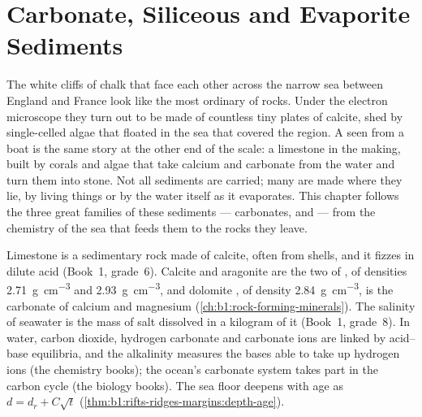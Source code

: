 \chapter{Carbonate, Siliceous and Evaporite Sediments}\label{ch:b1:chemical-biogenic-sediments}

The white cliffs of chalk that face each other across the narrow sea between
England and France look like the most ordinary of rocks. Under the electron
microscope they turn out to be made of countless tiny plates of calcite, shed
by single-celled algae that floated in the sea that covered the region. A
 seen from a boat is the same story at the other end of the scale: a
limestone in the making, built by corals and algae that take calcium and
carbonate from the water and turn them into stone. Not all sediments are
carried; many are made where they lie, by living things or by the water itself
as it evaporates. This chapter follows the three great families of these
sediments --- carbonates,  and  --- from the
chemistry of the sea that feeds them to the rocks they leave.

\begin{recall}
Limestone is a sedimentary rock made of calcite, often from shells, and it
fizzes in dilute acid (Book~1, grade~6). Calcite and aragonite are the two
 of , of densities \qty{2.71}{g.cm^{-3}} and
\qty{2.93}{g.cm^{-3}}, and dolomite , of density
\qty{2.84}{g.cm^{-3}}, is the carbonate of calcium and magnesium
(\cref{ch:b1:rock-forming-minerals}). The salinity of seawater is the mass of
salt dissolved in a kilogram of it (Book~1, grade~8). In water, carbon dioxide,
hydrogen carbonate and carbonate ions are linked by acid--base equilibria, and
the alkalinity measures the bases able to take up hydrogen ions (the chemistry
books); the ocean's carbonate system takes part in the carbon cycle (the biology
books). The sea floor deepens with age as $d = d_r + C\sqrt t$
(\cref{thm:b1:rifts-ridges-margins:depth-age}).
\end{recall}

